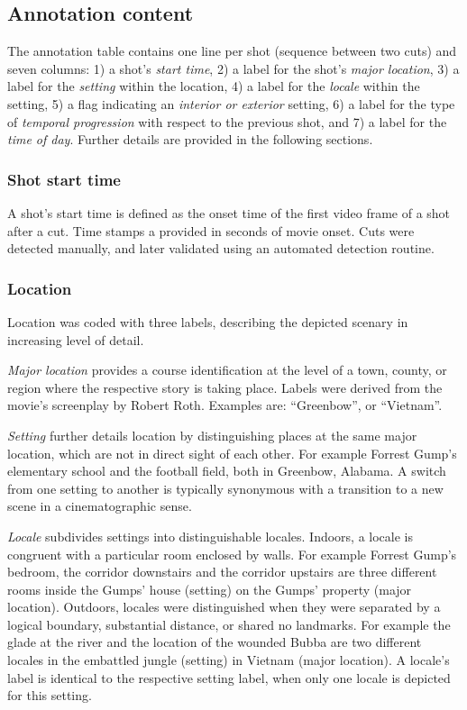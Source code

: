 \documentclass[10pt,a4paper,twocolumn]{article}
\begin{document}
\subsection*{Annotation content}

The annotation table contains one line per shot (sequence between two cuts) and
seven columns: 1) a shot's \textit{start time}, 2) a label for the shot's
\textit{major location}, 3) a label for the \textit{setting} within the
location, 4) a label for the \textit{locale} within the setting, 5) a flag
indicating an \textit{interior or exterior} setting, 6) a label for the type of
\textit{temporal progression} with respect to the previous shot, and 7) a label
for the \textit{time of day}. Further details are provided in the following
sections.

\subsubsection*{Shot start time}

A shot's start time is defined as the onset time of the first video frame of a
shot after a cut. Time stamps a provided in seconds of movie onset. Cuts were
detected manually, and later validated using an automated detection routine.

\subsubsection*{Location}

Location was coded with three labels, describing the depicted scenary
in increasing level of detail.

\textit{Major location} provides a course identification at the level of a
town, county, or region where the respective story is taking place.  Labels
were derived from the movie's screenplay by Robert Roth. Examples are:
``Greenbow'', or ``Vietnam''.

\textit{Setting} further details location by distinguishing places at the same
major location, which are not in direct sight of each other. For example
Forrest Gump's elementary school and the football field, both in Greenbow,
Alabama. A switch from one setting to another is typically synonymous with a
transition to a new scene in a cinematographic sense.

\textit{Locale} subdivides settings into distinguishable locales.  Indoors, a
locale is congruent with a particular room enclosed by walls. For example
Forrest Gump's bedroom, the corridor downstairs and the corridor upstairs are
three different rooms inside the Gumps' house (setting) on the Gumps' property
(major location). Outdoors, locales were distinguished when they were separated
by a logical boundary, substantial distance, or shared no landmarks.  For
example the glade at the river and the location of the wounded Bubba are two
different locales in the embattled jungle (setting) in Vietnam (major
location). A locale's label is identical to the respective setting label, when
only one locale is depicted for this setting.
\end{document}
